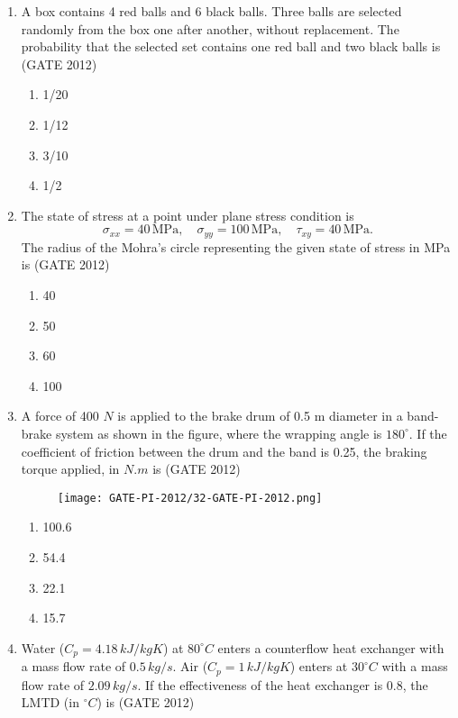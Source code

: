\documentclass[journal,12pt,onecolumn]{IEEEtran}
\theoremstyle{remark}
\begin{document}
\begin{enumerate}
\vspace{1cm}
\item  A box contains 4 red balls and 6 black balls. Three balls are selected randomly from the box one after another, without replacement. The probability that the selected set contains one red ball and two black balls is
\hfill{(GATE 2012)}

\begin{enumerate}
\item 1/20
\item 1/12
\item 3/10
\item 1/2
\end{enumerate}

\vspace{1cm}
\item  The state of stress at a point under plane stress condition is
\[
\sigma_{xx} = 40 \, \text{MPa}, \quad \sigma_{yy} = 100 \, \text{MPa}, \quad \tau_{xy} = 40 \, \text{MPa}.
\]
The radius of the Mohra's circle representing the given state of stress in MPa is
\hfill{(GATE 2012)}

\begin{enumerate}
\item 40
\item 50
\item 60
\item 100
\end{enumerate}
\vspace{1cm}
\item A force of 400 $N$ is applied to the brake drum of 0.5 m diameter in a band-brake system as shown in the figure, where the wrapping angle is $180^\circ$. If the coefficient of friction between the drum and the band is 0.25, the braking torque applied, in $N.m$ is
\hfill{(GATE 2012)}

\begin{figure}[h!]
\centering
\texttt{[image: GATE-PI-2012/32-GATE-PI-2012.png]}
\caption{}
\label{q32}
\end{figure}

\begin{enumerate}
\item 100.6
\item 54.4
\item 22.1
\item 15.7
\end{enumerate}
\vspace{1cm}

\item Water ($C_p=4.18 \, kJ/kgK$) at $80^\circ C$ enters a counterflow heat exchanger with a mass flow rate of $0.5 \, kg/s$. Air ($C_p = 1 \, kJ/kgK$) enters at $30^\circ C$ with a mass flow rate of $2.09 \, kg/s$. If the effectiveness of the heat exchanger is $0.8$, the LMTD (in $^\circ C$) is
\hfill{(GATE 2012)}


\end{enumerate}
\end{document}
